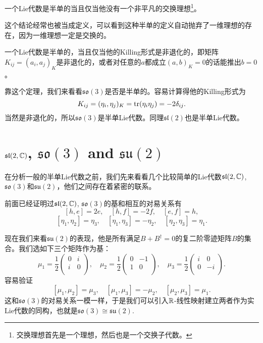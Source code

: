 \begin{theo}
一个Lie代数是半单的当且仅当他没有一个非平凡的交换理想\footnote{交换理想首先是一个理想，然后也是一个交换子代数。}。
\end{theo}
这个结论经常也被当成定义，可以看到这种半单的定义自动抛弃了一维理想的存在，因为一维理想一定是交换的。

\begin{theo}
一个Lie代数是半单的，当且仅当他的Killing形式是非退化的，即矩阵$K_{ij}=(a_i,a_j)_K$是非退化的，或者对任意的$a$都成立$(a,b)_K=0$的话能推出$b=0$。
\end{theo}

靠这个定理，我们来看看$\mathfrak{so}(3)$是否是半单的。容易计算得他的Killing形式为
\[
	K_{ij}=(\eta_i,\eta_j)_K=\operatorname{tr}(\eta_i\eta_j)=-2\delta_{ij}.
\]
当然是非退化的，所以$\mathfrak{so}(3)$是半单Lie代数。同理$\mathfrak{sl}(2)$也是半单Lie代数。

\section{$\mathfrak{sl}(2,\mathbb{C})$, $\mathfrak{so}(3)$ and $\mathfrak{su}(2)$}
在分析一般的半单Lie代数之前，我们先来看看几个比较简单的Lie代数$\mathfrak{sl}(2,\mathbb{C})$, $\mathfrak{so}(3)$和$\mathfrak{su}(2)$，他们之间存在着紧密的联系。

前面已经证明过$\mathfrak{sl}(2,\mathbb{C})$, $\mathfrak{so}(3)$的基和相互的对易关系有
\[
[h,e]=2e,\quad[h,f]=-2f,\quad[e,f]=h,
\]
\[
	[\eta_1,\eta_2]=\eta_3,\quad [\eta_1,\eta_3]=-\eta_2,\quad [\eta_2,\eta_3]=\eta_1.
\]

现在我们来看$\mathfrak{su}(2)$的表现，他是所有满足$B+B^\dag=0$的复二阶零迹矩阵$B$的集合。我们选如下三个矩阵作为基：
\[
\mu_1=\frac{1}{2}\begin{pmatrix}
	0&i\\
	i&0\\
\end{pmatrix},\quad
\mu_2=\frac{1}{2}\begin{pmatrix}
	0&-1\\
	1&0\\
\end{pmatrix},\quad
\mu_3=\frac{1}{2}\begin{pmatrix}
	i&0\\
	0&-i\\
\end{pmatrix}.
\]
容易验证
\[
[\mu_1,\mu_2]=\mu_3,\quad [\mu_1,\mu_3]=-\mu_2,\quad [\mu_2,\mu_3]=\mu_1.
\]
这和$\mathfrak{so}(3)$的对易关系一模一样，于是我们可以引入$\mathbb{R}$-线性映射建立两者作为实Lie代数的同构，也就是$\mathfrak{so}(3)\cong \mathfrak{su}(2)$.

